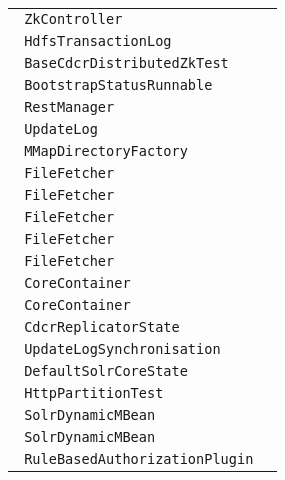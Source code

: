 \begin{center}
\begin{tabular}{ll}
\lstinline/ ZkController/&\raisebox{0pt}{\lstinline/   publishNodeAsDown(String)/}\\ 
\lstinline/ HdfsTransactionLog/&\raisebox{0pt}{\lstinline/   closeOutput()/}\\ 
\lstinline/ BaseCdcrDistributedZkTest/&\raisebox{0pt}{\lstinline/   waitForReplicationToComplete(String)/}\\ 
\lstinline/ BootstrapStatusRunnable/&\raisebox{0pt}{\lstinline/   sendBootstrapCommand()/}\\ 
\lstinline/ RestManager/&\raisebox{0pt}{\lstinline/   attachManagedResource(ManagedResourcere)/}\\ 
\lstinline/ UpdateLog/&\raisebox{0pt}{\lstinline/   seedBucketsWithHighestVersion(SolrIndex)/}\\ 
\lstinline/ MMapDirectoryFactory/&\raisebox{0pt}{\lstinline/   Directorycreate(String)/}\\ 
\lstinline/ FileFetcher/&\raisebox{0pt}{\lstinline/   cleanup()/}\\ 
\lstinline/ FileFetcher/&\raisebox{0pt}{\lstinline/   cleanup()/}\\ 
\lstinline/ FileFetcher/&\raisebox{0pt}{\lstinline/   cleanup()/}\\ 
\lstinline/ FileFetcher/&\raisebox{0pt}{\lstinline/   cleanup()/}\\ 
\lstinline/ FileFetcher/&\raisebox{0pt}{\lstinline/   cleanup()/}\\ 
\lstinline/ CoreContainer/&\raisebox{0pt}{\lstinline/   swap(String,String)/}\\ 
\lstinline/ CoreContainer/&\raisebox{0pt}{\lstinline/   swap(String,String)/}\\ 
\lstinline/ CdcrReplicatorState/&\raisebox{0pt}{\lstinline/   shutdown()/}\\ 
\lstinline/ UpdateLogSynchronisation/&\raisebox{0pt}{\lstinline/   run()/}\\ 
\lstinline/ DefaultSolrCoreState/&\raisebox{0pt}{\lstinline/   run()/}\\ 
\lstinline/ HttpPartitionTest/&\raisebox{0pt}{\lstinline/   waitToSeeReplicasActive(String)/}\\ 
\lstinline/ SolrDynamicMBean/&\raisebox{0pt}{\lstinline/   getAttributes(String[])/}\\ 
\lstinline/ SolrDynamicMBean/&\raisebox{0pt}{\lstinline/   getAttributes(String[])/}\\ 
\lstinline/ RuleBasedAuthorizationPlugin/&\raisebox{0pt}{\lstinline/   init(Map<String,Object>)/}\\ 

\end{tabular}
\end{center}
